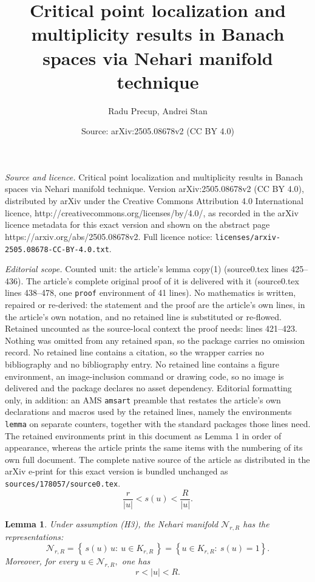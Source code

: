 \documentclass[10pt,a4paper]{amsart}
\title{Critical point localization and multiplicity results in Banach spaces via Nehari manifold technique}
\author{Radu Precup, Andrei Stan}
\date{Source: arXiv:2505.08678v2 (CC BY 4.0)}
\newtheorem{lemma}{Lemma}
\begin{document}
\maketitle

\noindent\emph{Source and licence.} Critical point localization and multiplicity results in Banach spaces via Nehari manifold technique. Version arXiv:2505.08678v2 (CC BY 4.0), distributed by arXiv under the Creative Commons Attribution 4.0 International licence, http://creativecommons.org/licenses/by/4.0/, as recorded in the arXiv licence metadata for this exact version and shown on the abstract page https://arxiv.org/abs/2505.08678v2. Full licence notice: \texttt{licenses/arxiv-2505.08678-CC-BY-4.0.txt}.\par\smallskip

\noindent\textit{Editorial scope.} Counted unit: the article's lemma copy(1) (source0.tex lines 425--436). The article's complete original proof of it is delivered with it (source0.tex lines 438--478, one \texttt{proof} environment of 41 lines). No mathematics is written, repaired or re-derived: the statement and the proof are the article's own lines, in the article's own notation, and no retained line is substituted or re-flowed.  Retained uncounted as the source-local context the proof needs: lines 421--423.  Nothing was omitted from any retained span, so the package carries no omission record.  No retained line contains a citation, so the wrapper carries no bibliography and no bibliography entry.  No retained line contains a figure environment, an image-inclusion command or drawing code, so no image is delivered and the package declares no asset dependency.  Editorial formatting only, in addition: an AMS \texttt{amsart} preamble that restates the article's own declarations and macros used by the retained lines, namely the environments \texttt{lemma} on separate counters, together with the standard packages those lines need.  The retained environments print in this document as Lemma 1 in order of appearance, whereas the article prints the same items with the numbering of its own full document.  The complete native source of the article as distributed in the arXiv e-print for this exact version is bundled unchanged as \texttt{sources/178057/source0.tex}.
\begin{equation}
\frac{r}{|u|}<s\left( u\right) <\frac{R}{|u|}.  \label{f5}
\end{equation}

\begin{lemma}
\label{lc copy(1)}Under assumption (H3), the Nehari manifold $\mathcal{N}%
_{r,R}$ has the representations:
\begin{equation*}
\mathcal{N}_{r,R}=\left\{ \,s(u)\,u:\ u\in K_{r,R}\,\right\} =\left\{ u\in
K_{r,R}:\ s\left( u\right) =1\right\} .
\end{equation*}%
Moreover, for every $u\in \mathcal{N}_{r,R},$ one has
\begin{equation}
r<\left\vert u\right\vert <R.  \label{f2}
\end{equation}
\end{lemma}
\end{document}
